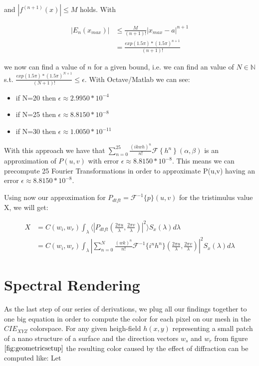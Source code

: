 and $|f^{(n+1)}(x)|\leq M$ holds. With 

\begin{align}
|E_{n}(x_{max})|
 &\leq\frac{M}{(n+1)!}|x_{max}-a|^{n+1} \nonumber \\
 &= \frac{exp(1.5\pi)*(1.5\pi)^{n+1}}{(n+1)!}
\end{align}

we now can find a value of $n$ for a given bound, i.e. we can find an value of $N\mathbb{\in N}$ s.t. $\frac{exp(1.5\pi)*(1.5\pi)^{N+1}}{(N+1)!}\leq\epsilon$.
With Octave/Matlab we can see: 

\begin{itemize}
\item if N=20 then $\epsilon\approx2.9950*10^{-4}$
\item if N=25 then $\epsilon\approx8.8150*10^{-8}$
\item if N=30 then $\epsilon\approx1.0050*10^{-11}$
\end{itemize}

With this approach we have that $\sum_{n=0}^{25}\frac{(ikwh)^{n}}{n!}\mathcal{F}\left\{ h{}^{n}\right\} (\alpha,\beta)$ is
an approximation of $P(u,v)$ with error $\epsilon\approx8.8150*10^{-8}$. This means we can precompute 25 Fourier Transformations in order to approximate P(u,v) having an error $\epsilon\approx8.8150*10^{-8}$. 

Using now our approximation for $P_{dtft} = \mathcal{F}^{-1}\{p\}(u,v)$ for the tristimulus value X, we will get:

\begin{align}
X 
& = C(w_i,w_r) \int_{\lambda} \langle \left|P_{dtft}(\frac{2\pi u}{\lambda}, \frac{2\pi v}{\lambda})\right|^2\rangle S_x(\lambda)d\lambda \nonumber \\
& = C(w_i,w_r) \int_{\lambda} \left| \sum_{n=0}^N \frac{(wk)^n}{n!} \mathcal{F}^{-1}\{i^n h^n\}(\frac{2\pi u}{\lambda}, \frac{2\pi v}{\lambda})\right|^2 S_x(\lambda)d\lambda
\label{eq:xcolexpression}
\end{align}

\section{Spectral Rendering}
As the last step of our series of derivations, we plug all our findings together to one big equation in order to compute the color for each pixel on our mesh in the $CIE_{XYZ}$ colorspace. For any given heigh-field $h(x,y)$ representing a small patch of a nano structure of a surface and the direction vectors $w_s$ and $w_r$ from figure $\ref{fig:geometricsetup}$ the resulting color caused by the effect of diffraction can be computed like: Let 

